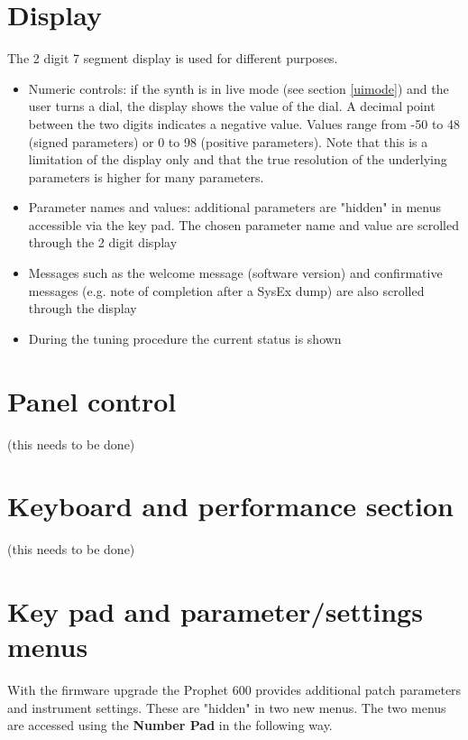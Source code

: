 \documentclass[draft,landscape, 11pt, oneside]{report}
\newenvironment{flowtext}{\addmargin[0cm]{7cm}}{\endaddmargin} %
\begin{document}
\begin{flowtext}

\section{Display}

The 2 digit 7 segment display is used for different purposes.

\begin{itemize}
  \setlength\itemsep{0cm}
  \item Numeric controls: if the synth is in live mode (see section \ref{uimode}) and the user turns a dial, the display shows the value of the dial. A decimal point between the two digits indicates a negative value. Values range from -50 to 48 (signed parameters) or 0 to 98 (positive parameters). Note that this is a limitation of the display only and that the true resolution of the underlying parameters is higher for many parameters.  
  \item Parameter names and values: additional parameters are "hidden" in menus accessible via the key pad. The chosen parameter name and value are scrolled through the 2 digit display
  \item Messages such as the welcome message (software version) and confirmative messages (e.g. note of completion after a SysEx dump) are also scrolled through the display
  \item During the tuning procedure the current status is shown        
\end{itemize}

\section{Panel control}

(this needs to be done)

\section{Keyboard and performance section}

(this needs to be done)

\section{Key pad and parameter/settings menus}

With the firmware upgrade the Prophet 600 provides additional patch parameters and instrument settings. These are "hidden" in two new menus. The two menus are accessed using the \textbf{Number Pad} in the following way. 


\end{flowtext}
\end{document}
